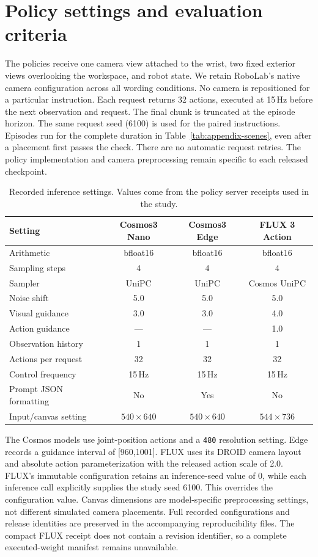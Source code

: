 \documentclass{article}
\begin{document}
\section{Policy settings and evaluation criteria}\label{app:settings}
The policies receive one camera view attached to the wrist, two fixed exterior views overlooking the workspace, and robot state. We retain RoboLab's native camera configuration across all wording conditions. No camera is repositioned for a particular instruction. Each request returns 32 actions, executed at 15\,Hz before the next observation and request. The final chunk is truncated at the episode horizon. The same request seed (6100) is used for the paired instructions. Episodes run for the complete duration in Table~\ref{tab:appendix-scenes}, even after a placement first passes the check. There are no automatic request retries. The policy implementation and camera preprocessing remain specific to each released checkpoint.

\begin{table}[htbp]
\centering\small
\caption{Recorded inference settings. Values come from the policy server receipts used in the study.}
\label{tab:appendix-settings}
\begin{tabular}{@{}lccc@{}}
\toprule Setting & Cosmos3 Nano & Cosmos3 Edge & FLUX 3 Action\\
\midrule
Arithmetic & bfloat16 & bfloat16 & bfloat16\\
Sampling steps & 4 & 4 & 4\\
Sampler & UniPC & UniPC & Cosmos UniPC\\
Noise shift & 5.0 & 5.0 & 5.0\\
Visual guidance & 3.0 & 3.0 & 4.0\\
Action guidance & --- & --- & 1.0\\
Observation history & 1 & 1 & 1\\
Actions per request & 32 & 32 & 32\\
Control frequency & 15\,Hz & 15\,Hz & 15\,Hz\\
Prompt JSON formatting & No & Yes & No\\
Input/canvas setting & $540\!\times\!640$ & $540\!\times\!640$ & $544\!\times\!736$\\
\bottomrule
\end{tabular}
\end{table}

The Cosmos models use joint-position actions and a \texttt{480} resolution setting. Edge records a guidance interval of [960,1001]. FLUX uses its DROID camera layout and absolute action parameterization with the released action scale of 2.0. FLUX's immutable configuration retains an inference-seed value of 0, while each inference call explicitly supplies the study seed 6100. This overrides the configuration value. Canvas dimensions are model-specific preprocessing settings, not different simulated camera placements. Full recorded configurations and release identities are preserved in the accompanying reproducibility files. The compact FLUX receipt does not contain a revision identifier, so a complete executed-weight manifest remains unavailable.
\end{document}
